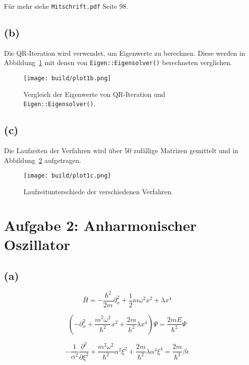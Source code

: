 \documentclass{scrartcl}
\begin{document}
Für mehr siehe \texttt{Mitschrift.pdf} Seite 98.


\subsection*{(b)}
Die QR-Iteration wird verwendet, um Eigenwerte zu berechnen.
Diese werden in Abbildung~\ref{fig:1b} mit denen von \texttt{Eigen::Eigensolver()} berechneten verglichen.
\begin{figure}[ht]
  \centering
  \texttt{[image: build/plot1b.png]}
  \caption{Vergleich der Eigenwerte von QR-Iteration und \texttt{Eigen::Eigensolver()}.}%
  \label{fig:1b}
\end{figure}

\subsection*{(c)}
Die Laufzeiten der Verfahren wird über 50 zufällige Matrizen gemittelt und in Abbildung~\ref{fig:1c} aufgetragen.
\begin{figure}[ht]
  \centering
  \texttt{[image: build/plot1c.png]}
  \caption{Laufzeitunterschiede der verschiedenen Verfahren.}%
  \label{fig:1c}
\end{figure}

\section*{Aufgabe 2: Anharmonischer Oszillator}
\subsection*{(a)}

\begin{equation}
		\bar{H} = - \frac{\hbar^2}{2m} \partial^2_x + \frac{1}{2} m \omega^2 x^2
		+ \lambda x^4
\end{equation}

\begin{equation}
		\left( - \partial_x^2 + \frac{m^2 \omega^2}{\hbar^2} x^2 + \frac{2m}{h^2}
		\lambda x^4 \right) \Psi = \frac{2 m  E}{\hbar^2} \Psi
\end{equation}

\begin{equation}
		- \frac{1}{\alpha^2} \frac{\partial^2}{\partial \xi^2} + \frac{m^2
		\omega^2}{\hbar^2} \alpha^2 \xi^2 + \frac{2m}{\hbar^2} \lambda \alpha^4
		\xi^4 = \frac{2m}{\hbar^2} \beta \epsilon
\end{equation}
\end{document}
